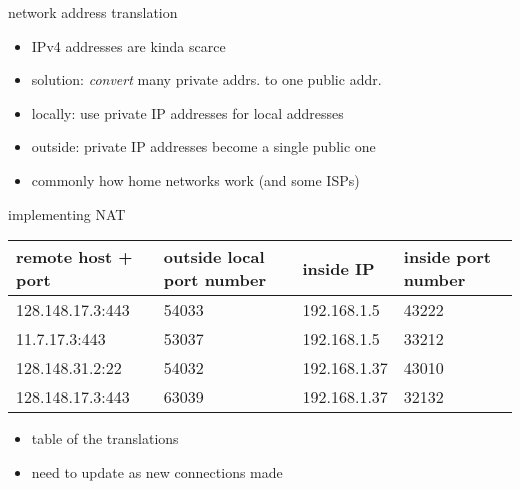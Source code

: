 \begin{frame}{network address translation}
\begin{itemize}
\item IPv4 addresses are kinda scarce
\item solution: \textit{convert} many private addrs. to one public addr.
\item locally: use private IP addresses for local addresses
\item outside: private IP addresses become a single public one
\item commonly how home networks work (and some ISPs)
\end{itemize}
\end{frame}

\begin{frame}{implementing NAT}
\small
\begin{tabular}{llll}
remote host + port & outside local port number & inside IP & inside port number \\ \hline
128.148.17.3:443 & 54033 & 192.168.1.5 & 43222 \\
11.7.17.3:443 & 53037 & 192.168.1.5 & 33212 \\
128.148.31.2:22 & 54032 & 192.168.1.37 & 43010 \\
128.148.17.3:443 & 63039 & 192.168.1.37 & 32132 \\
\end{tabular}
\begin{itemize}
\item table of the translations
\item need to update as new connections made
\end{itemize}
\end{frame}
